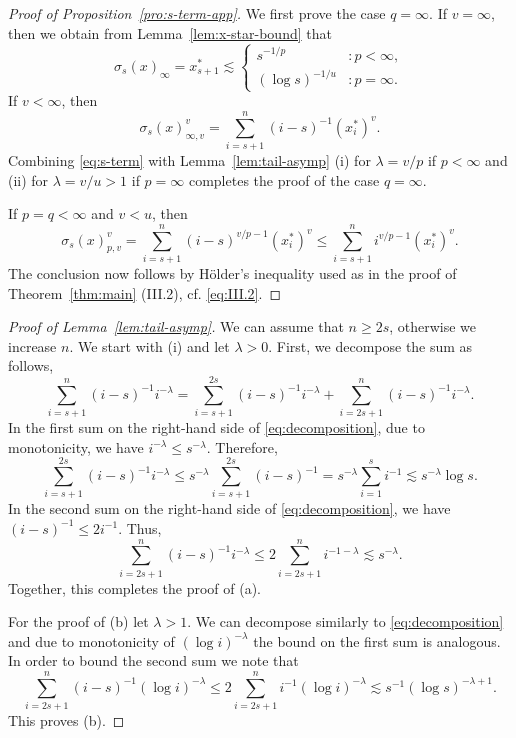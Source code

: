 \documentclass[a4paper,12pt]{article}
\theoremstyle{definition}
\begin{document}
\begin{proof}[Proof of Proposition~\ref{pro:s-term-app}]
We first prove the case $q=\infty$. If $v=\infty$, then we obtain from Lemma~\ref{lem:x-star-bound} that
\begin{equation} \label{eq:s-term}
\sigma_s(x)_{\infty}
=x_{s+1}^*
\lesssim
\begin{cases}
	s^{-1/p}&\colon p<\infty,\\	
	(\log s)^{-1/u}&\colon p=\infty.
\end{cases}
\end{equation}
If $v<\infty$, then 
\[
\sigma_s(x)_{\infty,v}^v
=\sum_{i=s+1}^{n}(i-s)^{-1}(x_i^*)^v .
\]
Combining \eqref{eq:s-term} with Lemma~\ref{lem:tail-asymp} (i) for $\lambda=v/p$ if $p<\infty$ and (ii) for $\lambda=v/u>1$ if $p=\infty$ completes the proof of the case $q=\infty$.

If $p=q<\infty$ and $v<u$, then 
\[
\sigma_s(x)_{p,v}^v
=\sum_{i=s+1}^{n}(i-s)^{v/p-1}(x_i^*)^v
\le \sum_{i=s+1}^{n}i^{v/p-1}(x_i^*)^v.
\]
The conclusion now follows by H\"older's inequality used as in the proof of Theorem~\ref{thm:main} (III.2), cf. \eqref{eq:III.2}.
\end{proof}

\begin{proof}[Proof of Lemma~\ref{lem:tail-asymp}]
We can assume that $n\ge 2s$, otherwise we increase $n$. We start with (i) and let $\lambda>0$. First, we decompose the sum as follows,
\begin{equation} \label{eq:decomposition}
\sum_{i=s+1}^n (i-s)^{-1}i^{-\lambda}
=\sum_{i=s+1}^{2s} (i-s)^{-1}i^{-\lambda}
+\sum_{i=2s+1}^n (i-s)^{-1}i^{-\lambda}.
\end{equation}
In the first sum on the right-hand side of \eqref{eq:decomposition}, due to monotonicity, we have $i^{-\lambda}\le s^{-\lambda}$. Therefore, 
\[
\sum_{i=s+1}^{2s} (i-s)^{-1}i^{-\lambda}
\le s^{-\lambda}\sum_{i=s+1}^{2s} (i-s)^{-1}
= s^{-\lambda}\sum_{i=1}^{s} i^{-1}
\lesssim s^{-\lambda} \log s.
\]
In the second sum on the right-hand side of \eqref{eq:decomposition}, we have $(i-s)^{-1}\le 2i^{-1}$. Thus, 
\[
\sum_{i=2s+1}^n (i-s)^{-1}i^{-\lambda}
\le 2 \sum_{i=2s+1}^n i^{-1-\lambda}
\lesssim s^{-\lambda}.
\]
Together, this completes the proof of (a).

For the proof of (b) let $\lambda>1$. We can decompose similarly to \eqref{eq:decomposition} and due to monotonicity of $(\log i)^{-\lambda}$ the bound on the first sum is analogous. In order to bound the second sum we note that
\[
\sum_{i=2s+1}^n (i-s)^{-1}(\log i)^{-\lambda}
\le 2 \sum_{i=2s+1}^n i^{-1}(\log i)^{-\lambda}
\lesssim s^{-1}(\log s)^{-\lambda+1}.
\]
This proves (b). 
\end{proof}
\end{document}
